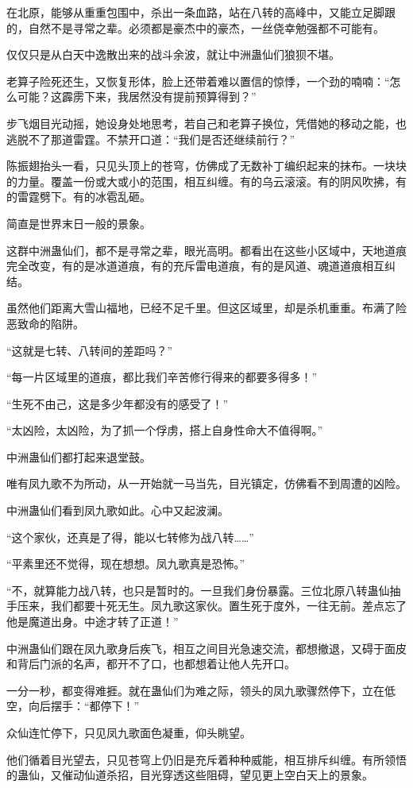 \begin{this_body}
在北原，能够从重重包围中，杀出一条血路，站在八转的高峰中，又能立足脚跟的，自然不是寻常之辈。必须都是豪杰中的豪杰，一丝侥幸勉强都不可能有。

仅仅只是从白天中逸散出来的战斗余波，就让中洲蛊仙们狼狈不堪。

老算子险死还生，又恢复形体，脸上还带着难以置信的惊悸，一个劲的喃喃：“怎么可能？这霹雳下来，我居然没有提前预算得到？”

步飞烟目光动摇，她设身处地思考，若自己和老算子换位，凭借她的移动之能，也逃脱不了那道雷霆。不禁开口道：“我们是否还继续前行？”

陈振翅抬头一看，只见头顶上的苍穹，仿佛成了无数补丁编织起来的抹布。一块块的力量。覆盖一份或大或小的范围，相互纠缠。有的乌云滚滚。有的阴风吹拂，有的雷霆劈下。有的冰雹乱砸。

简直是世界末日一般的景象。

这群中洲蛊仙们，都不是寻常之辈，眼光高明。都看出在这些小区域中，天地道痕完全改变，有的是冰道道痕，有的充斥雷电道痕，有的是风道、魂道道痕相互纠结。

虽然他们距离大雪山福地，已经不足千里。但这区域里，却是杀机重重。布满了险恶致命的陷阱。

“这就是七转、八转间的差距吗？”

“每一片区域里的道痕，都比我们辛苦修行得来的都要多得多！”

“生死不由己，这是多少年都没有的感受了！”

“太凶险，太凶险，为了抓一个俘虏，搭上自身性命大不值得啊。”

中洲蛊仙们都打起来退堂鼓。

唯有凤九歌不为所动，从一开始就一马当先，目光镇定，仿佛看不到周遭的凶险。

中洲蛊仙们看到凤九歌如此。心中又起波澜。

“这个家伙，还真是了得，能以七转修为战八转……”

“平素里还不觉得，现在想想。凤九歌真是恐怖。”

“不，就算能力战八转，也只是暂时的。一旦我们身份暴露。三位北原八转蛊仙抽手压来，我们都要十死无生。凤九歌这家伙。置生死于度外，一往无前。差点忘了他是魔道出身。中途才转了正道！”

中洲蛊仙们跟在凤九歌身后疾飞，相互之间目光急速交流，都想撤退，又碍于面皮和背后门派的名声，都开不了口，也都想着让他人先开口。

一分一秒，都变得难捱。就在蛊仙们为难之际，领头的凤九歌骤然停下，立在低空，向后摆手：“都停下！”

众仙连忙停下，只见凤九歌面色凝重，仰头眺望。

他们循着目光望去，只见苍穹上仍旧是充斥着种种威能，相互排斥纠缠。有所领悟的蛊仙，又催动仙道杀招，目光穿透这些阻碍，望见更上空白天上的景象。


\end{this_body}
